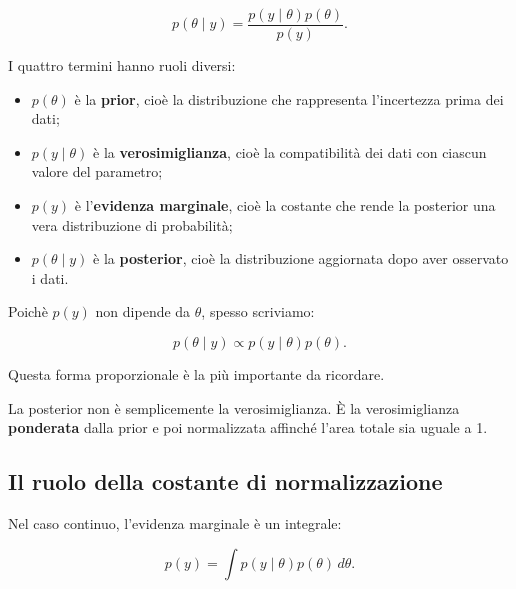 \documentclass[
  italian,
  letterpaper,
  a4paper,
  11pt,
  open=any]{scrbook}
\providecommand{\tightlist}{%
  \setlength{\itemsep}{0pt}\setlength{\parskip}{0pt}}
\theoremstyle{plain}
\theoremstyle{definition}
\theoremstyle{definition}
\theoremstyle{remark}
\begin{document}
\[
p(\theta \mid y) =
\frac{p(y \mid \theta)p(\theta)}{p(y)}.
\]

I quattro termini hanno ruoli diversi:

\begin{itemize}
\tightlist
\item
  \(p(\theta)\) è la \textbf{prior}, cioè la distribuzione che
  rappresenta l'incertezza prima dei dati;
\item
  \(p(y \mid \theta)\) è la \textbf{verosimiglianza}, cioè la
  compatibilità dei dati con ciascun valore del parametro;
\item
  \(p(y)\) è l'\textbf{evidenza marginale}, cioè la costante che rende
  la posterior una vera distribuzione di probabilità;
\item
  \(p(\theta \mid y)\) è la \textbf{posterior}, cioè la distribuzione
  aggiornata dopo aver osservato i dati.
\end{itemize}

Poichè \(p(y)\) non dipende da \(\theta\), spesso scriviamo:

\[
p(\theta \mid y) \propto p(y \mid \theta)p(\theta).
\]

Questa forma proporzionale è la più importante da ricordare.

\begin{tcolorbox}[enhanced jigsaw, arc=.35mm, bottomrule=.15mm, bottomtitle=1mm, breakable, colback=white, colbacktitle=quarto-callout-important-color!10!white, colframe=quarto-callout-important-color-frame, coltitle=black, left=2mm, leftrule=.75mm, opacityback=0, opacitybacktitle=0.6, rightrule=.15mm, title=\textcolor{quarto-callout-important-color}{\faExclamation}\hspace{0.5em}{Importante}, titlerule=0mm, toprule=.15mm, toptitle=1mm]

La posterior non è semplicemente la verosimiglianza. È la
verosimiglianza \textbf{ponderata} dalla prior e poi normalizzata
affinché l'area totale sia uguale a 1.

\end{tcolorbox}

\subsection{Il ruolo della costante di
normalizzazione}\label{il-ruolo-della-costante-di-normalizzazione}

Nel caso continuo, l'evidenza marginale è un integrale:

\[
p(y) = \int p(y \mid \theta)p(\theta)\,d\theta.
\]
\end{document}
